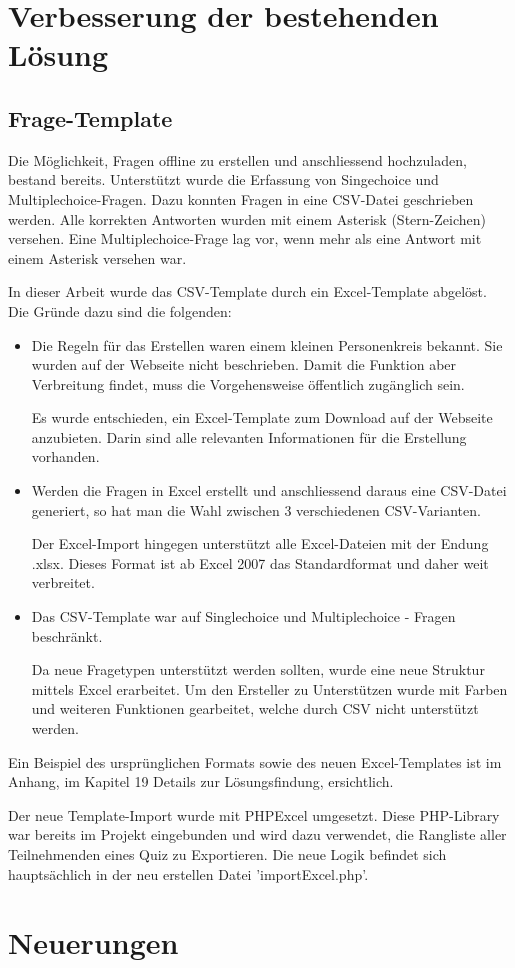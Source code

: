 
\section{Verbesserung der bestehenden Lösung}

\subsection{Frage-Template}
Die Möglichkeit, Fragen offline zu erstellen und anschliessend hochzuladen, bestand bereits. Unterstützt wurde die Erfassung von Singechoice und Multiplechoice-Fragen. Dazu konnten Fragen in eine CSV-Datei geschrieben werden. Alle korrekten Antworten wurden mit einem Asterisk (Stern-Zeichen) versehen. Eine Multiplechoice-Frage lag vor, wenn mehr als eine Antwort mit einem Asterisk versehen war.

In dieser Arbeit wurde das CSV-Template durch ein Excel-Template abgelöst. Die Gründe dazu sind die folgenden:
\begin{itemize}
	\item Die Regeln für das Erstellen waren einem kleinen Personenkreis bekannt. Sie wurden auf der Webseite nicht beschrieben. Damit die Funktion aber Verbreitung findet, muss die Vorgehensweise öffentlich zugänglich sein.
	
	Es wurde entschieden, ein Excel-Template zum Download auf der Webseite anzubieten. Darin sind alle relevanten Informationen für die Erstellung vorhanden.
	
	\item Werden die Fragen in Excel erstellt und anschliessend daraus eine CSV-Datei generiert, so hat man die Wahl zwischen 3 verschiedenen CSV-Varianten.
	
	Der Excel-Import hingegen unterstützt alle Excel-Dateien mit der Endung .xlsx. Dieses Format ist ab Excel 2007 das Standardformat und daher weit verbreitet.
	\cite{microsoft2016}
	
	\item Das CSV-Template war auf Singlechoice und Multiplechoice - Fragen beschränkt.
	
	Da neue Fragetypen unterstützt werden sollten, wurde eine neue Struktur mittels Excel erarbeitet. Um den Ersteller zu Unterstützen wurde mit Farben und weiteren Funktionen gearbeitet, welche durch CSV nicht unterstützt werden.
\end{itemize}

Ein Beispiel des ursprünglichen Formats sowie des neuen Excel-Templates ist im Anhang, im Kapitel 19 Details zur Lösungsfindung, ersichtlich.

Der neue Template-Import wurde mit PHPExcel \cite{phpexcel} umgesetzt. Diese PHP-Library war bereits im Projekt eingebunden und wird dazu verwendet, die Rangliste aller Teilnehmenden eines Quiz zu Exportieren. Die neue Logik befindet sich hauptsächlich in der neu erstellen Datei 'importExcel.php'.

\section{Neuerungen}






